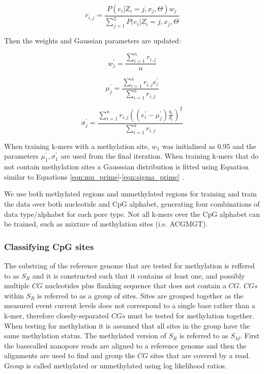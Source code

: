\begin{equation}
    \label{eqn:responsibility}
    r_{i,j} = \frac{P(e_i|Z_i=j, x_j,\Theta)w_j}{\sum_{j = 1}^2 P(e_i | Z_i = j, x_j, \Theta}
\end{equation}

Then the weights and Gaussian parameters are updated:

\begin{equation}
w_j^\prime = \frac{\sum_{i = 1}^n r_{i,j}}{n}
\end{equation}

\begin{equation}
\label{eqn:mu_prime}
\mu_j^\prime = \frac{\sum_{i = 1}^n r_{i,j}e^\prime_i}{\sum_{i = 1}^n r_{i,j}}
\end{equation}

\begin{equation}
\label{eqn:sigma_prime}
\sigma_j^\prime = \frac{\sum_{i = 1}^n r_{i,j}((e^\prime_i-\mu_j^\prime)\frac{b_i}{d_i})^2}{\sum_{i = 1}^n r_{i,j}}
\end{equation}

When training k-mers with a methylation site, $w_1$ was initialized as 0.95 and the parameters $\mu_1^\prime, \sigma_1^\prime$ are used from the final iteration. When training k-mers that do not contain methylation sites a Gausssian distribution is fitted using Equation similar to Equations \ref{eqn:mu_prime}-\ref{eqn:sigma_prime} \cite{simpson2017detecting}.

We use both methylated regions and unmethylated regions for training and train the data over both nucleotide and CpG alphabet, generating four combinations of data type/alphabet for each pore type. Not all k-mers over the CpG alphabet can be trained, such as mixture of methylation sites (i.e. ACGMGT).

\subsubsection{Classifying CpG sites}
The substring of the reference genome that are tested for methylation is reffered to as $S_R$ and it is constructed such that it contains at least one, and possibly multiple $CG$ nucleotides plus flanking sequence that does not contain a $CG$. $CGs$ within $S_R$ is referred to as a group of sites. Sites are grouped together as the measured event current levels does not correspond to a single base rather than a k-mer, therefore closely-separated $CGs$ must be tested for methylation together. When testing for methylation it is assumed that all sites in the group have the same methylation status. The methylated version of $S_R$ is referred to as $S_M$. First the basecalled nanopore reads are aligned to a reference genome and then the alignments are used to find and group the $CG$ sites that are covered by a read. Group is called methylated or unmethylated using log likelihood ratios.


